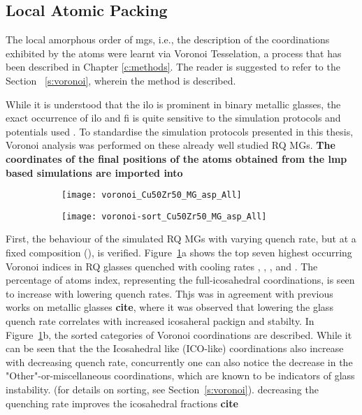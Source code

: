 \subsection{Local Atomic Packing} \label{s:voro-mgs}
The local amorphous order of \gls{mg}s, i.e., the description of the coordinations exhibited by the atoms were learnt via Voronoi Tesselation, a process that has been described in Chapter \ref{c:methods}. The reader is suggested to refer to the Section~ \ref{s:voronoi}, wherein the method is described. \par

\begin{selfcite}
While it is understood that the \gls{ilo} is prominent in binary metallic glasses, the exact occurrence of \gls{ilo} and \gls{fi} is quite sensitive to the simulation protocols and potentials used \cite{Adibi2014,Avchaciov2013, Lu2018, Li2009a}. To standardise the simulation protocols presented in this thesis, Voronoi analysis was performed on these already well studied RQ MGs. \textbf{The coordinates of the final positions of the atoms obtained from the \gls{lmp} based simulations are imported into } \par

\begin{figure}[!ht]
	\centering
	\begin{subfigure}{0.45\linewidth} \centering \texttt{[image: voronoi\_Cu50Zr50\_MG\_asp\_All]}
		\subcaption{} \end{subfigure}%
	\begin{subfigure}{0.45\linewidth} \centering \texttt{[image: voronoi-sort\_Cu50Zr50\_MG\_asp\_All]}
		\subcaption{} \end{subfigure}
	\label{f:voro_qr}
\end{figure}
\end{selfcite}

First, the behaviour of the simulated RQ MGs with varying quench rate, but at a fixed composition (\cz), is verified. Figure~\ref{f:voro_qr}a shows the top seven highest occurring Voronoi indices in \cz RQ glasses quenched with cooling rates , , , and . The percentage of atoms  index, representing the full-icosahedral coordinations, is seen to increase with lowering quench rates. Thjs was in agreement with previous works on metallic glasses \textbf{cite}, where it was observed that lowering the glass quench rate correlates with increased icosaheral packign and stabilty. In Figure~\ref{f:voro_qr}b, the sorted categories of Voronoi coordinations are described. While it can be seen that the the Icosahedral like (ICO-like) coordinations also increase with decreasing quench rate, concurrently one can also notice the decrease in the "Other"-or-miscellaneous coordinations, which are known to be indicators of glass instability. (for details on sorting, see Section~\ref{s:voronoi}).  decreasing the quenching rate improves the icosahedral fractions \textbf{cite} \par

